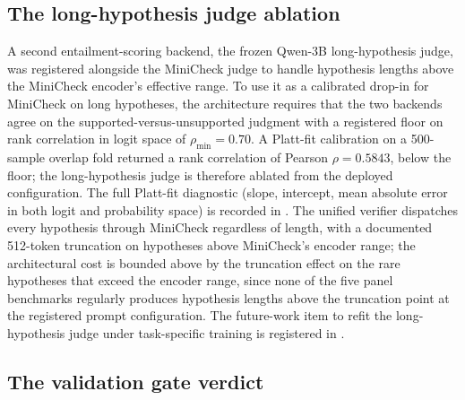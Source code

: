 

\FloatBarrier

\subsection{The long-hypothesis judge ablation}
\label{sec:adj-judge-ablation}

A second entailment-scoring backend, the frozen Qwen-3B long-hypothesis judge, was registered alongside the MiniCheck judge to handle hypothesis lengths above the MiniCheck encoder's effective range. To use it as a calibrated drop-in for MiniCheck on long hypotheses, the architecture requires that the two backends agree on the supported-versus-unsupported judgment with a registered floor on rank correlation in logit space of $\rho_{\min} = 0.70$. A Platt-fit calibration on a 500-sample overlap fold returned a rank correlation of Pearson $\rho = 0.5843$, below the floor; the long-hypothesis judge is therefore ablated from the deployed configuration. The full Platt-fit diagnostic (slope, intercept, mean absolute error in both logit and probability space) is recorded in . The unified verifier dispatches every hypothesis through MiniCheck regardless of length, with a documented 512-token truncation on hypotheses above MiniCheck's encoder range; the architectural cost is bounded above by the truncation effect on the rare hypotheses that exceed the encoder range, since none of the five panel benchmarks regularly produces hypothesis lengths above the truncation point at the registered prompt configuration. The future-work item to refit the long-hypothesis judge under task-specific training is registered in .

\subsection{The validation gate verdict}
\label{sec:adj-gate}

